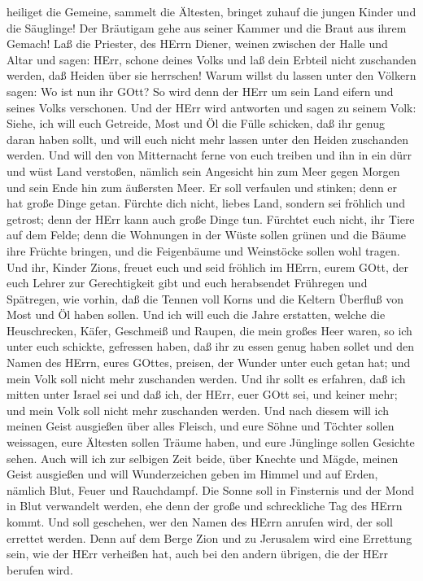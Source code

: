 heiliget die Gemeine, sammelt die Ältesten, bringet zuhauf die jungen
Kinder und die Säuglinge! Der Bräutigam gehe aus seiner Kammer und die
Braut aus ihrem Gemach!  Laß die Priester, des HErrn
Diener, weinen zwischen der Halle und Altar und sagen: HErr, schone
deines Volks und laß dein Erbteil nicht zuschanden werden, daß Heiden
über sie herrschen! Warum willst du lassen unter den Völkern sagen: Wo
ist nun ihr GOtt?  So wird denn der HErr um sein Land
eifern und seines Volks verschonen.  Und der HErr wird
antworten und sagen zu seinem Volk: Siehe, ich will euch Getreide, Most
und Öl die Fülle schicken, daß ihr genug daran haben sollt, und will
euch nicht mehr lassen unter den Heiden zuschanden werden. 
Und will den von Mitternacht ferne von euch treiben und ihn in ein dürr
und wüst Land verstoßen, nämlich sein Angesicht hin zum Meer gegen
Morgen und sein Ende hin zum äußersten Meer. Er soll verfaulen und
stinken; denn er hat große Dinge getan.  Fürchte dich
nicht, liebes Land, sondern sei fröhlich und getrost; denn der HErr kann
auch große Dinge tun.  Fürchtet euch nicht, ihr Tiere auf
dem Felde; denn die Wohnungen in der Wüste sollen grünen und die Bäume
ihre Früchte bringen, und die Feigenbäume und Weinstöcke sollen wohl
tragen.  Und ihr, Kinder Zions, freuet euch und seid
fröhlich im HErrn, eurem GOtt, der euch Lehrer zur Gerechtigkeit gibt
und euch herabsendet Frühregen und Spätregen, wie vorhin, 
daß die Tennen voll Korns und die Keltern Überfluß von Most und Öl haben
sollen.  Und ich will euch die Jahre erstatten, welche die
Heuschrecken, Käfer, Geschmeiß und Raupen, die mein großes Heer waren,
so ich unter euch schickte, gefressen haben,  daß ihr zu
essen genug haben sollet und den Namen des HErrn, eures GOttes, preisen,
der Wunder unter euch getan hat; und mein Volk soll nicht mehr
zuschanden werden.  Und ihr sollt es erfahren, daß ich
mitten unter Israel sei und daß ich, der HErr, euer GOtt sei, und keiner
mehr; und mein Volk soll nicht mehr zuschanden werden.  Und
nach diesem will ich meinen Geist ausgießen über alles Fleisch, und eure
Söhne und Töchter sollen weissagen, eure Ältesten sollen Träume haben,
und eure Jünglinge sollen Gesichte sehen.  Auch will ich
zur selbigen Zeit beide, über Knechte und Mägde, meinen Geist ausgießen
 und will Wunderzeichen geben im Himmel und auf Erden,
nämlich Blut, Feuer und Rauchdampf.  Die Sonne soll in
Finsternis und der Mond in Blut verwandelt werden, ehe denn der große
und schreckliche Tag des HErrn kommt.  Und soll geschehen,
wer den Namen des HErrn anrufen wird, der soll errettet werden. Denn auf
dem Berge Zion und zu Jerusalem wird eine Errettung sein, wie der HErr
verheißen hat, auch bei den andern übrigen, die der HErr berufen wird.

